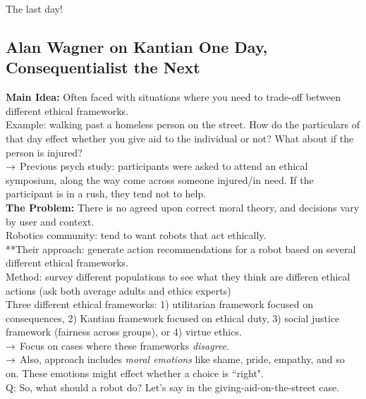 The last day!

\subsection{Alan Wagner on Kantian One Day, Consequentialist the Next}

{\bf Main Idea:} Often faced with situations where you need to trade-off between different ethical frameworks. \\

Example: walking past a homeless person on the street. How do the particulars of that day effect whether you give aid to the individual or not? What about if the person is injured?\\

$\rightarrow$ Previous psych study: participants were asked to attend an ethical symposium, along the way come across someone injured/in need. If the participant is in a rush, they tend not to help. \\

{\bf The Problem:} There is no agreed upon correct moral theory, and decisions vary by user and context. \\

Robotics community: tend to want robots that act ethically. \\

**Their approach: generate action recommendations for a robot based on several different ethical frameworks. \\

Method: survey different populations to see what they think are differen ethical actions (ask both average adults and ethics experts) \\

Three different ethical frameworks: 1) utilitarian framework focused on consequences, 2) Kantian framework focused on ethical duty, 3) social justice framework (fairness across groups), or 4) virtue ethics. \\

$\rightarrow$ Focus on cases where these frameworks {\it disagree}. \\

$\rightarrow$ Also, approach includes {\it moral emotions} like shame, pride, empathy, and so on. These emotions might effect whether a choice is ``right". \\

Q: So, what should a robot do? Let's say in the giving-aid-on-the-street case.\\

